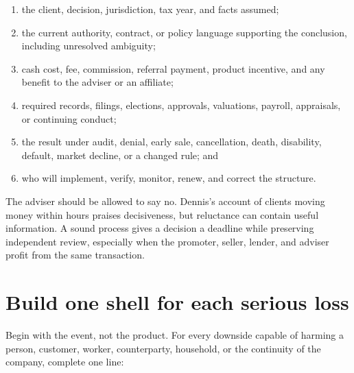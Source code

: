 \begin{enumerate}[itemsep=0.13em]
\item the client, decision, jurisdiction, tax year, and facts assumed;
\item the current authority, contract, or policy language supporting the
  conclusion, including unresolved ambiguity;
\item cash cost, fee, commission, referral payment, product incentive, and any
  benefit to the adviser or an affiliate;
\item required records, filings, elections, approvals, valuations, payroll,
  appraisals, or continuing conduct;
\item the result under audit, denial, early sale, cancellation, death,
  disability, default, market decline, or a changed rule; and
\item who will implement, verify, monitor, renew, and correct the structure.
\end{enumerate}

The adviser should be allowed to say no. Dennis's account of clients moving
money within hours praises decisiveness, but reluctance can contain useful
information. A sound process gives a decision a deadline while preserving
independent review, especially when the promoter, seller, lender, and adviser
profit from the same transaction.

\section{Build one shell for each serious loss}

Begin with the event, not the product. For every downside capable of harming a
person, customer, worker, counterparty, household, or the continuity of the
company, complete one line:

